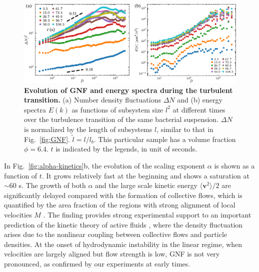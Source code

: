 \begin{figure}[!ht]
\begin{center}
\includegraphics[width=5.5in]{figs/5-GNF/8.pdf}
\caption[Evolution of GNF and Energy Spectra during the Turbulent Transition]
{
\textbf{Evolution of GNF and energy spectra during the turbulent transition.} (a) Number density fluctuations $\Delta N$ and (b) energy spectra $E(k)$ as functions of subsystem size $l^2$ at different times over the turbulence transition of the same bacterial suspension. $\Delta N$ is normalized by the length of subsystems $l$, similar to that in Fig.~\ref{fig:GNF}. $\tilde{l} = l/l_b$. This particular sample has a volume fraction $\phi=6.4$. $t$ is indicated by the legends, in unit of seconds.
}
\label{fig:GNF-energy-spectra-kinetics}
\end{center}
\end{figure}

In Fig.~\ref{fig:alpha-kinetics}b, the evolution of the scaling exponent $\alpha$ is shown as a function of $t$. It grows relatively fast at the beginning and shows a saturation at $\sim 60$ s. The growth of both $\alpha$ and the large scale kinetic energy $\langle \bm{v}^2 \rangle/2$ are significantly delayed compared with the formation of collective flows, which is quantified by the area fraction of the regions with strong alignment of local velocities $M$ \cite{Peng2020}.
The finding provides strong experimental support to an important prediction of the kinetic theory of active fluids \cite{Saintillan2008a,Saintillan2008b}, where the density fluctuation arises due to the nonlinear coupling between collective flows and particle densities. At the onset of hydrodynamic instability in the linear regime, when velocities are largely aligned but flow strength is low, GNF is not very pronounced, as confirmed by our experiments at early times.


